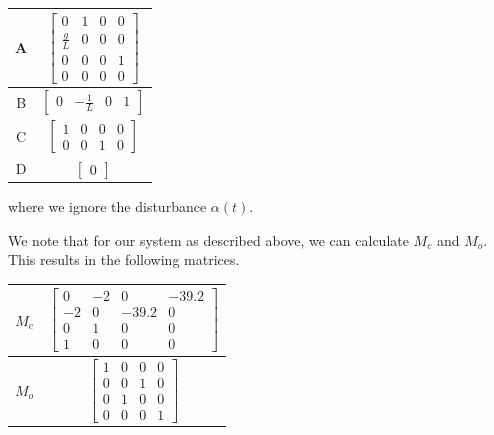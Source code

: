 \documentclass[10pt]{article}
\begin{document}
\begin{center}
    \begin{tabular}{| c | c |}
        \hline
        A & $\begin{bmatrix}
                0 & 1 & 0 & 0 \\
                \frac{g}{L} & 0 & 0 & 0 \\
                0 & 0 & 0 & 1 \\
                0 & 0 & 0 & 0
             \end{bmatrix}$ \\
        \hline
        B & $\begin{bmatrix}
                0 & -\frac{1}{L} & 0 & 1
             \end{bmatrix}$ \\
        \hline
        C & $\begin{bmatrix}
                1 & 0 & 0 & 0 \\
                0 & 0 & 1 & 0
             \end{bmatrix}$ \\
        \hline
        D & $\begin{bmatrix}
                0
             \end{bmatrix}$ \\
        \hline
    \end{tabular}
\end{center}

where we ignore the disturbance $\alpha(t)$.

We note that for our system as described above, we can calculate $M_c$ and $M_o$. This results in the following matrices.

\begin{center}
    \begin{tabular}{| c | c |}
        \hline
        $M_c$ & $\begin{bmatrix}
                0 & -2 & 0 & -39.2 \\
                -2 & 0 & -39.2 & 0 \\
                0 & 1 & 0 & 0 \\
                1 & 0 & 0 & 0
             \end{bmatrix}$ \\
        \hline
        $M_o$ & $\begin{bmatrix}
                1 & 0 & 0 & 0 \\
                0 & 0 & 1 & 0 \\
                0 & 1 & 0 & 0 \\
                0 & 0 & 0 & 1
             \end{bmatrix}$ \\
        \hline
    \end{tabular}
\end{center}
\end{document}

